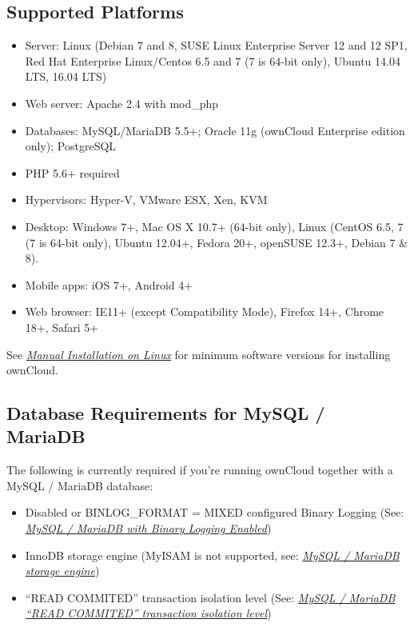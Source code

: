 \documentclass[letterpaper,10pt,english]{sphinxmanual}
\begin{document}
\subsection{Supported Platforms}
\label{installation/system_requirements:supported-platforms}\begin{itemize}
\item {} 
Server: Linux (Debian 7 and 8, SUSE Linux Enterprise Server 12 and 12 SP1, Red Hat Enterprise Linux/Centos 6.5 and 7 (7 is 64-bit only), Ubuntu 14.04 LTS, 16.04 LTS)

\item {} 
Web server: Apache 2.4 with mod\_php

\item {} 
Databases: MySQL/MariaDB 5.5+; Oracle 11g (ownCloud Enterprise edition only); PostgreSQL

\item {} 
PHP 5.6+ required

\item {} 
Hypervisors: Hyper-V, VMware ESX, Xen, KVM

\item {} 
Desktop: Windows 7+, Mac OS X 10.7+ (64-bit
only), Linux (CentOS 6.5, 7 (7 is 64-bit only), Ubuntu 12.04+, Fedora 20+, openSUSE 12.3+, Debian 7 \& 8).

\item {} 
Mobile apps: iOS 7+, Android 4+

\item {} 
Web browser: IE11+ (except Compatibility Mode), Firefox 14+, Chrome 18+,
Safari 5+

\end{itemize}

See {\hyperref[installation/source_installation::doc]{\emph{Manual Installation on Linux}}} for minimum software versions for installing
ownCloud.


\subsection{Database Requirements for MySQL / MariaDB}
\label{installation/system_requirements:database-requirements-for-mysql-mariadb}
The following is currently required if you're running ownCloud together with a MySQL / MariaDB database:
\begin{itemize}
\item {} 
Disabled or BINLOG\_FORMAT = MIXED configured Binary Logging (See: {\hyperref[configuration_database/linux_database_configuration:db-binlog-label]{\emph{MySQL / MariaDB with Binary Logging Enabled}}})

\item {} 
InnoDB storage engine (MyISAM is not supported, see: {\hyperref[configuration_database/linux_database_configuration:db-storage-engine-label]{\emph{MySQL / MariaDB storage engine}}})

\item {} 
``READ COMMITED'' transaction isolation level (See: {\hyperref[configuration_database/linux_database_configuration:db-transaction-label]{\emph{MySQL / MariaDB ``READ COMMITED'' transaction isolation level}}})

\end{itemize}
\end{document}
